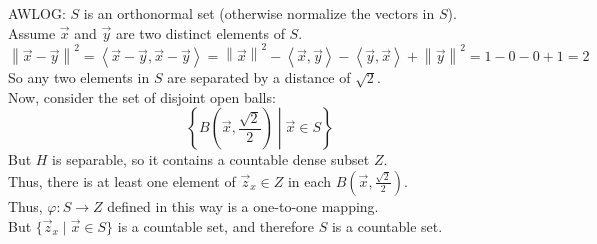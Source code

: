 \documentclass[letterpaper,12pt,fleqn]{article}
\newcommand{\vx}{\vec{x}}
\newcommand{\vy}{\vec{y}}
\newcommand{\vz}{\vec{z}}
\newcommand{\p}{\varphi}
\newcommand{\norm}[1]{\left\|#1\right\|}
\newcommand{\inner}[1]{\left<#1\right>}
\begin{document}
\begin{theproof}
  AWLOG: $S$ is an orthonormal set (otherwise normalize the vectors in $S$). \\
  Assume $\vx$ and $\vy$ are two distinct elements of $S$. \\
  $\norm{\vx-\vy}^2=\inner{\vx-\vy,\vx-\vy}=
  \norm{\vx}^2-\inner{\vx,\vy}-\inner{\vy,\vx}+\norm{\vy}^2=1-0-0+1=2$ \\
  So any two elements in $S$ are separated by a distance of $\sqrt{2}$. \\
  Now, consider the set of disjoint open balls:
  \[\left\{B\left(\vx,\frac{\sqrt{2}}{2}\right)\middle|\vx\in S\right\}\]
  But $H$ is separable, so it contains a countable dense subset $Z$. \\
  Thus, there is at least one element of $\vz_x\in Z$ in each
  $B\left(\vx,\frac{\sqrt{2}}{2}\right)$. \\
  Thus, $\p:S\to Z$ defined in this way is a one-to-one mapping. \\
  But $\{\vz_x\mid\vx\in S\}$ is a countable set, and therefore $S$ is a
  countable set.
\end{theproof}
\end{document}
